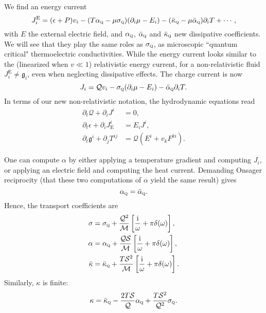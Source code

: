 \documentclass[10pt, oneside]{book}
\begin{document}
\begin{doublespace}
We find an energy current \begin{equation}
J^{\mathrm{E}}_i = (\epsilon+P) v_i - (T \alpha_{\textsc{q}} - \mu \sigma_{\textsc{q}})(\partial_i \mu - E_i) - (\bar\kappa_{\textsc{q}} - \mu \bar\alpha_{\textsc{q}}) \partial_i T + \cdots,
\end{equation}
with $E$ the external electric field,  and $\alpha_{\textsc{q}}$, $\bar\alpha_{\textsc{q}}$ and $\bar\kappa_{\textsc{q}}$ new dissipative coefficients.     We will see that they play the same roles as $\sigma_{\textsc{q}}$, as microscopic ``quantum critical" thermoelectric conductivities.   While the energy current looks similar to the (linearized when $v\ll 1$) relativistic energy current,  for a non-relativistic fluid $J^{\mathrm{E}}_i \ne \mathfrak{g}_i$, even when neglecting dissipative effects.  The charge current is now \begin{equation}
J_i = \mathcal{Q}v_i - \sigma_{\textsc{q}}(\partial_i \mu - E_i) - \bar\alpha_{\textsc{q}} \partial_i T.
\end{equation}
 In terms of our new non-relativistic notation, the hydrodynamic equations read \begin{subequations}\begin{align}
\partial_t \mathcal{Q} + \partial_i J^i &= 0, \\
\partial_t \epsilon + \partial_i J^i_{\mathrm{E}} &=  E_i J^i, \\
\partial_t \mathfrak{g}^i + \partial_j T^{ij} &= \mathcal{Q}(E^i + v_k F^{ki}).
\end{align}\end{subequations}



One can compute $\alpha$ by either applying a temperature gradient and computing $J_i$, or applying an electric field and computing the heat current.   Demanding Onsager reciprocity (that these two computations of $\alpha$ yield the same result) gives \begin{equation}
\alpha_{\textsc{q}} = \bar\alpha_{\textsc{q}}.
\end{equation}
Hence, the transport coefficients are\begin{subequations}\label{eq:524results}\begin{align}
\sigma &= \sigma_{\textsc{q}} + \frac{\mathcal{Q}^2}{ \mathcal{M}}\left[\frac{\mathrm{i}}{\omega} + \pi \delta(\omega)\right], \\
\alpha &= \alpha_{\textsc{q}} + \frac{\mathcal{QS}}{ \mathcal{M}}\left[\frac{\mathrm{i}}{\omega}  + \pi \delta(\omega)\right], \\
\bar\kappa &= \bar\kappa_{\textsc{q}} + \frac{T\mathcal{S}^2}{\mathcal{M}}\left[\frac{\mathrm{i}}{\omega}  + \pi \delta(\omega)\right].
\end{align}\end{subequations}
Similarly, $\kappa$ is finite: \begin{equation}
\kappa  = \bar\kappa_{\textsc{q}} - \frac{2T\mathcal{S}}{\mathcal{Q}}\alpha_{\textsc{q}} + \frac{T\mathcal{S}^2}{\mathcal{Q}^2}\sigma_{\textsc{q}}.  \label{eq:kappagen}
\end{equation}


\end{doublespace}
\end{document}
